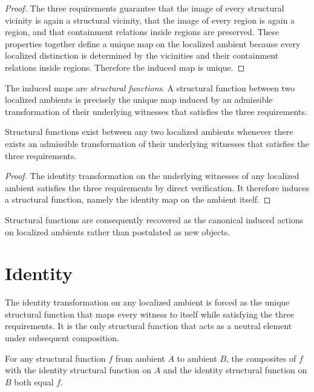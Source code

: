\documentclass[12pt,anyside]{book}
\newcommand{\term}[1]{\textit{#1}}             %
\begin{document}
\begin{proof}
The three requirements guarantee that the image of every structural vicinity is again a structural vicinity, that the image of every region is again a region, and that containment relations inside regions are preserved. These properties together define a unique map on the localized ambient because every localized distinction is determined by the vicinities and their containment relations inside regions. Therefore the induced map is unique.
\end{proof}

The induced maps are \term{structural functions}. A structural function between two localized ambients is precisely the unique map induced by an admissible transformation of their underlying witnesses that satisfies the three requirements.

\begin{theorem}[Existence]
Structural functions exist between any two localized ambients whenever there exists an admissible transformation of their underlying witnesses that satisfies the three requirements.
\end{theorem}

\begin{proof}
The identity transformation on the underlying witnesses of any localized ambient satisfies the three requirements by direct verification. It therefore induces a structural function, namely the identity map on the ambient itself.
\end{proof}

Structural functions are consequently recovered as the canonical induced actions on localized ambients rather than postulated as new objects.

\section{Identity}
The identity transformation on any localized ambient is forced as the unique structural function that maps every witness to itself while satisfying the three requirements. It is the only structural function that acts as a neutral element under subsequent composition.

\begin{theorem}
For any structural function $f$ from ambient $A$ to ambient $B$, the composites of $f$ with the identity structural function on $A$ and the identity structural function on $B$ both equal $f$.
\end{theorem}
\end{document}
